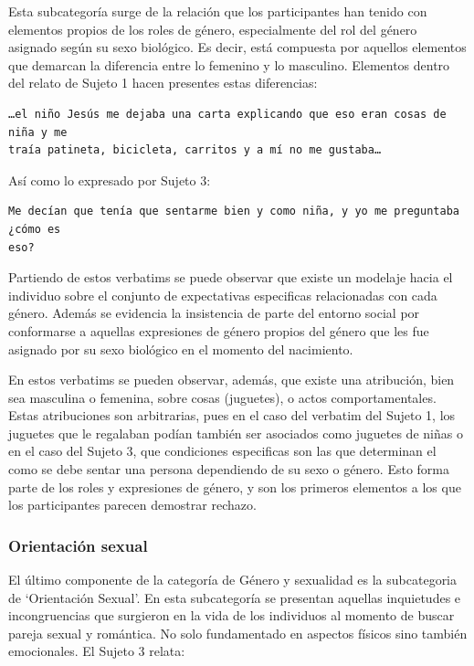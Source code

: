 Esta subcategoría surge de la relación que los participantes han tenido con
elementos propios de los roles de género, especialmente del rol del género
asignado según su sexo biológico. Es decir, está compuesta por aquellos
elementos que demarcan la diferencia entre lo femenino y lo masculino. Elementos
dentro del relato de Sujeto 1 hacen presentes estas diferencias:

\begin{verbatim}
…el niño Jesús me dejaba una carta explicando que eso eran cosas de niña y me
traía patineta, bicicleta, carritos y a mí no me gustaba…
\end{verbatim}

Así como lo expresado por Sujeto 3:

\begin{verbatim}
Me decían que tenía que sentarme bien y como niña, y yo me preguntaba ¿cómo es
eso?
\end{verbatim}

Partiendo de estos verbatims se puede observar que existe un modelaje hacia el
individuo sobre el conjunto de expectativas especificas relacionadas con cada
género. Además se evidencia la insistencia de parte del entorno social por
conformarse a aquellas expresiones de género propios del género que les fue
asignado por su sexo biológico en el momento del nacimiento.

En estos verbatims se pueden observar, además, que existe una atribución, bien
sea masculina o femenina, sobre cosas (juguetes), o actos comportamentales.
Estas atribuciones son arbitrarias, pues en el caso del verbatim del Sujeto 1,
los juguetes que le regalaban podían también ser asociados como juguetes de
niñas o en el caso del Sujeto 3, que condiciones especificas son las que
determinan el como se debe sentar una persona dependiendo de su sexo o género.
Esto forma parte de los roles y expresiones de género, y son los primeros
elementos a los que los participantes parecen demostrar rechazo.

\subsubsection{Orientación sexual}

El último componente de la categoría de Género y sexualidad es la subcategoria
de ‘Orientación Sexual’. En esta subcategoría se presentan aquellas inquietudes
e incongruencias que surgieron en la vida de los individuos al momento de buscar
pareja sexual y romántica. No solo fundamentado en aspectos físicos sino también
emocionales. El Sujeto 3 relata:

